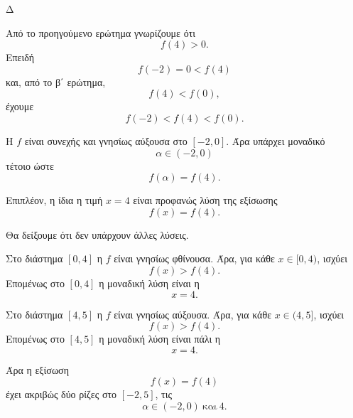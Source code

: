 \begin{thema}{Δ}
\begin{erwthma}
\item Από το προηγούμενο ερώτημα γνωρίζουμε ότι
\[
f(4)>0.
\]
Επειδή
\[
f(-2)=0<f(4)
\]
και, από το β΄ ερώτημα,
\[
f(4)<f(0),
\]
έχουμε
\[
f(-2)<f(4)<f(0).
\]

Η $f$ είναι συνεχής και γνησίως αύξουσα στο $[-2,0]$. Άρα υπάρχει
μοναδικό
\[
\alpha\in(-2,0)
\]
τέτοιο ώστε
\[
f(\alpha)=f(4).
\]

Επιπλέον, η ίδια η τιμή $x=4$ είναι προφανώς λύση της εξίσωσης
\[
f(x)=f(4).
\]

Θα δείξουμε ότι δεν υπάρχουν άλλες λύσεις.

Στο διάστημα $[0,4]$ η $f$ είναι γνησίως φθίνουσα. Άρα, για κάθε
$x\in[0,4)$, ισχύει
\[
f(x)>f(4).
\]
Επομένως στο $[0,4]$ η μοναδική λύση είναι η
\[
x=4.
\]

Στο διάστημα $[4,5]$ η $f$ είναι γνησίως αύξουσα. Άρα, για κάθε
$x\in(4,5]$, ισχύει
\[
f(x)>f(4).
\]
Επομένως στο $[4,5]$ η μοναδική λύση είναι πάλι η
\[
x=4.
\]

Άρα η εξίσωση
\[
f(x)=f(4)
\]
έχει ακριβώς δύο ρίζες στο $[-2,5]$, τις
\[
{\alpha\in(-2,0)\ \text{και}\ 4}.
\]
\end{erwthma}
\end{thema}

